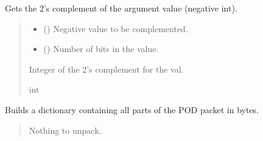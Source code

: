 \documentclass[letterpaper,10pt,english]{sphinxmanual}
\begin{document}
\begin{fulllineitems}
\begin{fulllineitems}
\end{fulllineitems}


\begin{fulllineitems}
\label{\detokenize{Morelia.Packets:Morelia.Packets.Packet.Packet.TwosComplement}}
\pysigstartsignatures
{}
\pysigstopsignatures
\sphinxAtStartPar
Gets the 2’s complement of the argument value (negative int).
\begin{quote}\begin{description}
\begin{itemize}
\item {} 
\sphinxAtStartPar
{} () \textendash{} Negative value to be complemented.

\item {} 
\sphinxAtStartPar
{} () \textendash{} Number of bits in the value.

\end{itemize}

\sphinxAtStartPar
Integer of the 2’s complement for the val.

\sphinxAtStartPar
int

\end{description}\end{quote}

\end{fulllineitems}


\begin{fulllineitems}
\label{\detokenize{Morelia.Packets:Morelia.Packets.Packet.Packet.UnpackAll}}
\pysigstartsignatures
{}
\pysigstopsignatures
\sphinxAtStartPar
Builds a dictionary containing all parts of the POD packet in bytes.
\begin{quote}\begin{description}
\sphinxAtStartPar
{} \textendash{} Nothing to unpack.


\end{description}
\end{quote}
\end{fulllineitems}
\end{fulllineitems}
\end{document}
